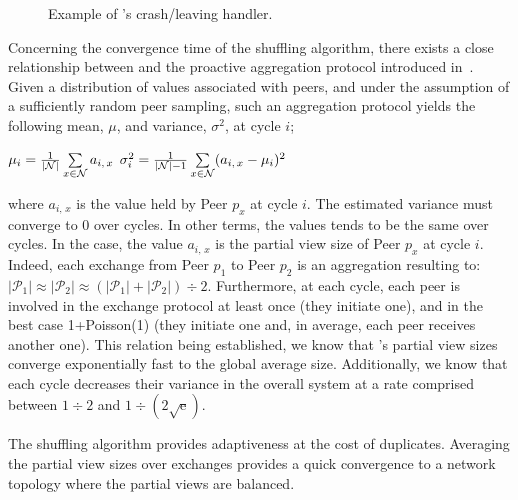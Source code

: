 \begin{figure*}
  \centering
  \hspace{10pt}
  \hspace{10pt}
  \caption{\label{fig:crashexample}Example of \SPRAY's crash/leaving
    handler. }
\end{figure*}

Concerning the convergence time of the shuffling algorithm, there
exists a close relationship between \SPRAY and the proactive
aggregation protocol introduced
in~\cite{jelasity2004epidemic}. Given a
distribution of values associated with peers, and under the assumption
of a sufficiently random peer sampling, such an aggregation protocol
yields the following mean, $\mu$, and variance, $\sigma^2$, at cycle
$i$;
\begin{center}
  $\mu_i = {1\over{|\mathcal{N}|}} \sum\limits_{x \in \mathcal{N}} a_{i,\,x}$
  \hfill
  $\sigma^2_i = {1\over{|\mathcal{N}|-1}}\sum\limits_{x \in \mathcal{N}}
  (a_{i,\,x} - \mu_i)^2$
\end{center}
where $a_{i,\,x}$ is the value held by Peer $p_x$ at cycle $i$. The
estimated variance must converge to $0$ over cycles. In other terms,
the values tends to be the same over cycles. In the \SPRAY case, the
value $a_{i,\,x}$ is the partial view size of Peer $p_x$ at cycle
$i$. Indeed, each exchange from Peer $p_1$ to Peer $p_2$ is an
aggregation resulting to:
$|\mathcal{P}_1|\approx|\mathcal{P}_2|\approx{(|\mathcal{P}_1| +
  |\mathcal{P}_2|) \div 2}$.  Furthermore, at each cycle, each peer is
involved in the exchange protocol at least once (they initiate one),
and in the best case 1+Poisson(1) (they initiate one and, in average,
each peer receives another one). This relation being established, we
know that \SPRAY's partial view sizes converge exponentially fast to
the global average size. Additionally, we know that each cycle
decreases their variance in the overall system at a rate comprised
between ${1\div 2}$ and $1\div ({2\sqrt{\text{e}}})$.

The shuffling algorithm provides adaptiveness at the cost of
duplicates. Averaging the partial view sizes over exchanges provides a quick
convergence to a network topology where the partial views are balanced.

